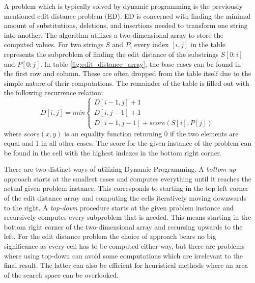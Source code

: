 \documentclass[thesis.tex]{subfiles}
\begin{document}
\par\noindent
A problem which is typically solved by dynamic programming is the previously mentioned edit distance problem (ED). ED is concerned with finding the minimal amount of substitutions, deletions, and insertions needed to transform one string into another. The algorithm utilizes a two-dimensional array to store the computed values. For two strings $S$ and $P$, every index $[i,j]$ in the table represents the subproblem of finding the edit distance of the substrings $S[0:i]$ and $P[0:j]$. 
\clearpage\noindent
In table \ref{fig:edit_distance_array}, the base cases can be found in the first row and column. These are often dropped from the table itself due to the simple nature of their computations. The remainder of the table is filled out with the following recurrence relation:
\begin{equation}
  D[i,j] = min
  \begin{cases}
    D[i-1,j] + 1\\
    D[i,j-1] + 1\\
    D[i-1,j-1] + score(S[i], P[j])
  \end{cases}
  \label{eq:ed_recurrence_relation}
\end{equation}
where $score(x, y)$ is an equality function returning 0 if the two elements are equal and 1 in all other cases. The score for the given instance of the problem can be found in the cell with the highest indexes in the bottom right corner.\\
\par\noindent
There are two distinct ways of utilizing Dynamic Programming. A \textit{bottom-up} approach starts at the smallest cases and computes everything until it reaches the actual given problem instance. This corresponds to starting in the top left corner of the edit distance array and computing the cells iteratively moving downwards to the right. A \textit{top-down} procedure starts at the given problem instance and recursively computes every subproblem that is needed. This means starting in the bottom right corner of the two-dimensional array and recursing upwards to the left. For the edit distance problem the choice of approach bears no big significance as every cell has to be computed either way, but there are problems where using top-down can avoid some computations which are irrelevant to the final result. The latter can also be efficient for heuristical methods where an area of the search space can be overlooked.
\end{document}
